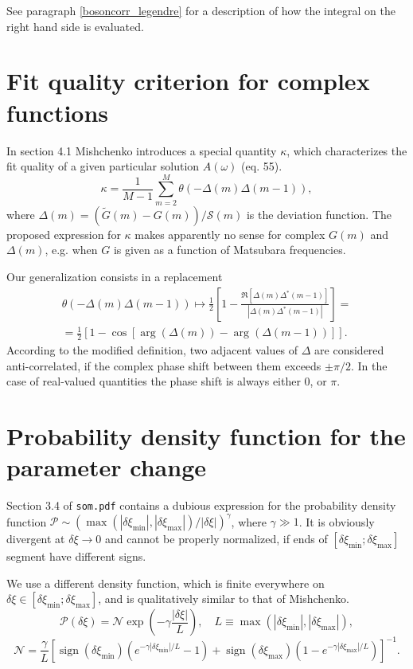 \documentclass[]{article}
\DeclareMathOperator{\sign}{sign}
\begin{document}
See paragraph \ref{bosoncorr_legendre} for a description of how the integral on
the right hand side is evaluated.

\section{Fit quality criterion for complex functions}
\label{fit_quality}

In section 4.1 Mishchenko introduces a special quantity $\kappa$, which characterizes the fit quality of a given particular solution
$A(\omega)$ (eq. 55).
\begin{equation}
	\kappa = \frac{1}{M-1}\sum_{m=2}^M\theta(-\Delta(m)\Delta(m-1)),
\end{equation}
where $\Delta(m) = (\tilde G(m) - G(m))/\mathcal{S}(m)$ is the deviation function. The proposed expression for $\kappa$ makes  apparently no sense for complex $G(m)$ and $\Delta(m)$, e.g. when $G$ is given as a function of Matsubara frequencies.

Our generalization consists in a replacement
\begin{multline}
	\theta(-\Delta(m)\Delta(m-1)) \mapsto
	\frac{1}{2}\left[1 - \frac{\Re[\Delta(m)\Delta^*(m-1)]}{|\Delta(m)\Delta^*(m-1)|} \right]=\\=
	\frac{1}{2}\left[ 1 - \cos[\arg(\Delta(m)) - \arg(\Delta(m-1))] \right].
\end{multline}
According to the modified definition, two adjacent values of $\Delta$ are considered anti-correlated, if the complex phase shift between them exceeds $\pm\pi/2$. In the case of real-valued quantities the phase shift is always either 0, or $\pi$.

\section{Probability density function for the parameter change}
\label{prob_function}

Section 3.4 of \verb|som.pdf| contains a dubious expression for the probability
density function $\mathcal{P}\sim (\max(|\delta\xi_\mathrm{min}|, |\delta\xi_\mathrm{max}|)/|\delta\xi|)^\gamma$, where $\gamma\gg1$. It is
obviously divergent at $\delta\xi\to0$ and cannot be properly normalized, if
ends of $[\delta\xi_\mathrm{min};\delta\xi_\mathrm{max}]$ segment have different signs.

We use a different density function, which is finite everywhere on $\delta\xi\in[\delta\xi_\mathrm{min};\delta\xi_\mathrm{max}]$, and is qualitatively similar to that of Mishchenko.
\begin{equation}
	\mathcal{P}(\delta\xi) = \mathcal{N}
	\exp\left(-\gamma \frac{|\delta\xi|}{L}\right), \quad
	L \equiv \max(|\delta\xi_\mathrm{min}|, |\delta\xi_\mathrm{max}|),
\end{equation}
\begin{equation}
	\mathcal{N} = \frac{\gamma}{L}\left[
		\sign(\delta\xi_\mathrm{min})(e^{-\gamma|\delta\xi_\mathrm{min}|/L} - 1) +
		\sign(\delta\xi_\mathrm{max})(1 - e^{-\gamma|\delta\xi_\mathrm{max}|/L})
	\right]^{-1}.
\end{equation}
\end{document}
